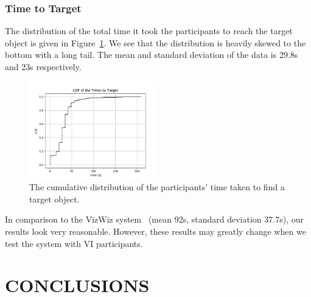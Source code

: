 \documentclass[a4paper, twoside]{article}
\begin{document}
\subsubsection{Time to Target}

\noindent The distribution of the total time it took the participants to reach the target object is given in Figure~\ref{fig:time-participants}. We see that the distribution is heavily skewed to the bottom with a long tail. The mean and standard deviation of the data is 29.8s and 23s respectively. %

\begin{figure}
  \centering
  \includegraphics[width=0.5\textwidth]{figures/cdf_total_time.png}
  \caption{The cumulative distribution of the participants' time taken to find a target object. }\label{fig:time-participants}
\end{figure}

In comparison to the VizWiz system~\cite{bigham2010vizwiz} (mean 92s, standard deviation 37.7s), our results look very reasonable. However, these results may greatly change when we test the system with VI participants.

\section{\uppercase{Conclusions}}\label{sec:conclusion}
\end{document}
